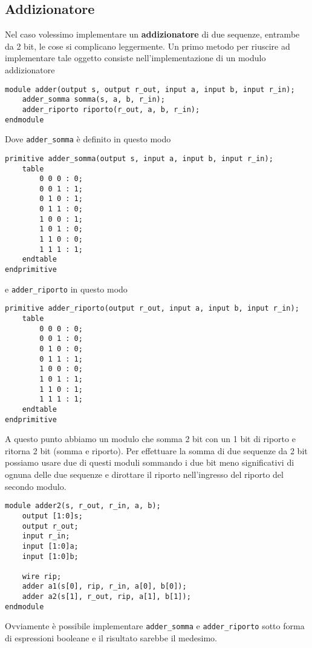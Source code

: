 \subsection{Addizionatore}
Nel caso volessimo implementare un \textbf{addizionatore} di due sequenze, entrambe da 2 bit, le
cose si complicano leggermente. Un primo metodo per riuscire ad implementare tale oggetto consiste
nell'implementazione di un modulo addizionatore
\begin{verbatim}
module adder(output s, output r_out, input a, input b, input r_in);
	adder_somma somma(s, a, b, r_in);
	adder_riporto riporto(r_out, a, b, r_in);
endmodule
\end{verbatim}
Dove \verb|adder_somma| è definito in questo modo
\begin{verbatim}
primitive adder_somma(output s, input a, input b, input r_in);
	table
		0 0 0 : 0;
		0 0 1 : 1;
		0 1 0 : 1;
		0 1 1 : 0;
		1 0 0 : 1;
		1 0 1 : 0;
		1 1 0 : 0;
		1 1 1 : 1;
	endtable
endprimitive
\end{verbatim}
e \verb|adder_riporto| in questo modo
\begin{verbatim}
primitive adder_riporto(output r_out, input a, input b, input r_in);
	table
		0 0 0 : 0;
		0 0 1 : 0;
		0 1 0 : 0;
		0 1 1 : 1;
		1 0 0 : 0;
		1 0 1 : 1;
		1 1 0 : 1;
		1 1 1 : 1;
	endtable
endprimitive
\end{verbatim}
A questo punto abbiamo un modulo che somma 2 bit con un 1 bit di riporto e ritorna 2 bit (somma e
riporto). Per effettuare la somma di due sequenze da 2 bit possiamo usare due di questi moduli
sommando i due bit meno significativi di ognuna delle due sequenze e dirottare il riporto
nell'ingresso del riporto del secondo modulo.
\begin{verbatim}
module adder2(s, r_out, r_in, a, b);
	output [1:0]s;
	output r_out;
	input r_in;
	input [1:0]a;
	input [1:0]b;

	wire rip;
	adder a1(s[0], rip, r_in, a[0], b[0]);
	adder a2(s[1], r_out, rip, a[1], b[1]);
endmodule
\end{verbatim}
Ovviamente è possibile implementare \verb|adder_somma| e \verb|adder_riporto| sotto forma di
espressioni booleane e il risultato sarebbe il medesimo.
